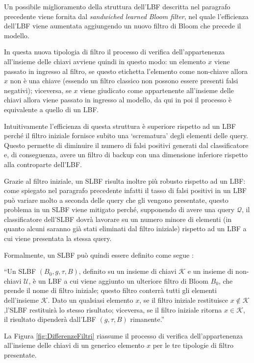 \documentclass[../../main.tex]{subfiles}
\begin{document}
    Un possibile miglioramento della struttura dell'LBF descritta nel paragrafo precedente viene fornita dal \textit{sandwiched learned Bloom filter}, nel quale l'efficienza dell'LBF viene aumentata aggiungendo un nuovo filtro di Bloom che precede il modello.

    In questa nuova tipologia di filtro il processo di verifica dell'appartenenza all'insieme delle chiavi avviene quindi in questo modo: un elemento $x$ viene passato in ingresso al filtro, se questo etichetta l'elemento come non-chiave allora $x$ non è una chiave (essendo un filtro classico non possono essere presenti falsi negativi); viceversa, se $x$ viene giudicato come appartenente all'insieme delle chiavi allora viene passato in ingresso al modello, da qui in poi il processo è equivalente a quello di un LBF.

    Intuitivamente l'efficienza di questa struttura è superiore rispetto ad un LBF perché il filtro iniziale fornisce subito una `scrematura' degli elementi delle query. Questo permette di diminuire il numero di falsi positivi generati dal classificatore e, di conseguenza, avere un filtro di backup con una dimensione inferiore rispetto alla controparte dell'LBF.

    Grazie al filtro iniziale, un SLBF risulta inoltre più robusto rispetto ad un LBF: come spiegato nel paragrafo precedente infatti il tasso di falsi positivi in un LBF può variare molto a seconda delle query che gli vengono presentate, questo problema in un SLBF viene mitigato perché, supponendo di avere una query $\mathcal{Q}$, il classificatore dell'SLBF dovrà lavorare su un numero minore di elementi (in quanto alcuni saranno già stati eliminati dal filtro iniziale) rispetto ad un LBF a cui viene presentata la stessa query.

    Formalmente, un SLBF può quindi essere definito come segue \cite{ma2020}: 

    ``Un SLBF $(B_0, g, \tau, B)$, definito su un insieme di chiavi $\mathcal{K}$ e un insieme di non-chiavi $\mathcal{U}$, è un LBF a cui viene aggiunto un ulteriore filtro di Bloom $B_0$, che prende il nome di filtro iniziale; questo filtro conterrà tutti gli elementi dell'insieme $\mathcal{K}$. Dato un qualsiasi elemento $x$, se il filtro iniziale restituisce $x \notin \mathcal{K}$,l'SLBF restituirà lo stesso risultato; viceversa, se il filtro iniziale ritorna $x \in \mathcal{K}$, il risultato dipenderà dall'LBF $(g, \tau, B)$ rimanente.''

    La Figura \ref{fig:DifferenzeFiltri} riassume il processo di verifica dell'appartenenza all'insieme delle chiavi di un generico elemento $x$ per le tre tipologie di filtro presentate.
    
\end{document}
